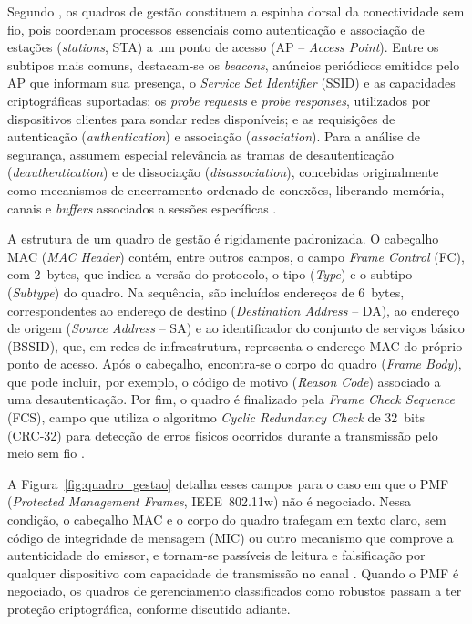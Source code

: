Segundo , os quadros de gestão constituem a espinha dorsal da conectividade sem fio, pois coordenam processos essenciais como autenticação e associação de estações (\textit{stations}, STA) a um ponto de acesso (AP – \textit{Access Point}). Entre os subtipos mais comuns, destacam‑se os \textit{beacons}, anúncios periódicos emitidos pelo AP que informam sua presença, o \textit{Service Set Identifier} (SSID) e as capacidades criptográficas suportadas; os \textit{probe requests} e \textit{probe responses}, utilizados por dispositivos clientes para sondar redes disponíveis; e as requisições de autenticação (\textit{authentication}) e associação (\textit{association}). Para a análise de segurança, assumem especial relevância as tramas de desautenticação (\textit{deauthentication}) e de dissociação (\textit{disassociation}), concebidas originalmente como mecanismos de encerramento ordenado de conexões, liberando memória, canais e \textit{buffers} associados a sessões específicas \cite{KohliosHayajneh2018}.

A estrutura de um quadro de gestão é rigidamente padronizada. O cabeçalho MAC (\textit{MAC Header}) contém, entre outros campos, o campo \textit{Frame Control} (FC), com 2~bytes, que indica a versão do protocolo, o tipo (\textit{Type}) e o subtipo (\textit{Subtype}) do quadro. Na sequência, são incluídos endereços de 6~bytes, correspondentes ao endereço de destino (\textit{Destination Address} – DA), ao endereço de origem (\textit{Source Address} – SA) e ao identificador do conjunto de serviços básico (BSSID), que, em redes de infraestrutura, representa o endereço MAC do próprio ponto de acesso. Após o cabeçalho, encontra‑se o corpo do quadro (\textit{Frame Body}), que pode incluir, por exemplo, o código de motivo (\textit{Reason Code}) associado a uma desautenticação. Por fim, o quadro é finalizado pela \textit{Frame Check Sequence} (FCS), campo que utiliza o algoritmo \textit{Cyclic Redundancy Check} de 32~bits (CRC‑32) para detecção de erros físicos ocorridos durante a transmissão pelo meio sem fio \cite{Lima2025}.

A Figura~\ref{fig:quadro_gestao} detalha esses campos para o caso em que o PMF (\textit{Protected Management Frames}, IEEE~802.11w) não é negociado. Nessa condição, o cabeçalho MAC e o corpo do quadro trafegam em texto claro, sem código de integridade de mensagem (MIC) ou outro mecanismo que comprove a autenticidade do emissor, e tornam-se passíveis de leitura e falsificação por qualquer dispositivo com capacidade de transmissão no canal \cite{KohliosHayajneh2018,Lima2025}. Quando o PMF é negociado, os quadros de gerenciamento classificados como robustos passam a ter proteção criptográfica, conforme discutido adiante.

